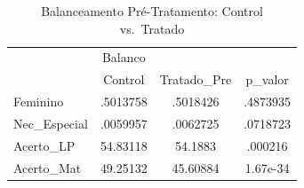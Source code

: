 ﻿\begin{table}[htbp]\centering
\caption{Balanceamento Pré-Tratamento: Control vs.\ Tratado}
\begin{tabular}{l*{3}{c}}
\toprule
            &     Balanco&            &            \\
            &    Control& Tratado\_Pre&     p\_valor\\
\midrule
Feminino    &    .5013758&    .5018426&    .4873935\\
Nec\_Especial&    .0059957&    .0062725&    .0718723\\
Acerto\_LP   &    54.83118&     54.1883&     .000216\\
Acerto\_Mat  &    49.25132&    45.60884&    1.67e-34\\
\bottomrule
\end{tabular}
\end{table}


